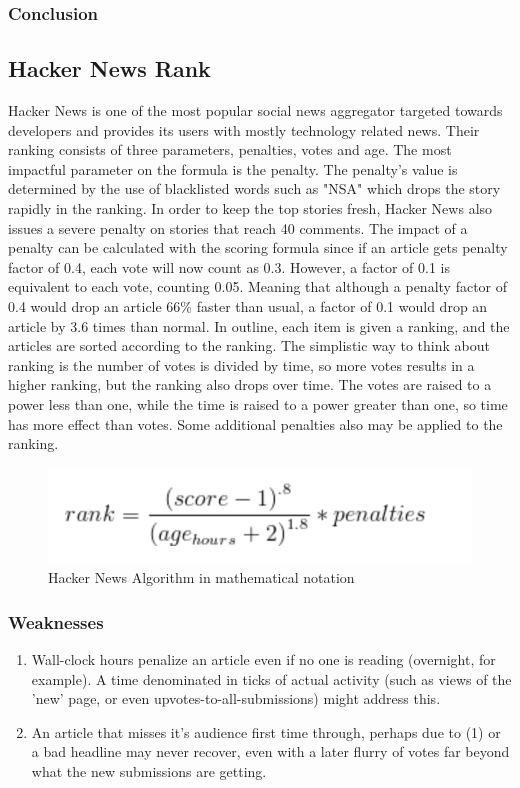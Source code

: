 \subsubsection {Conclusion}

\subsection{Hacker News Rank}
Hacker News is one of the most popular social news aggregator targeted towards developers and provides its users with mostly technology related news. Their ranking consists of three parameters, penalties, votes and age. The most impactful parameter on the formula is the penalty. The penalty's value is determined by the use of blacklisted words such as "NSA" which drops the story rapidly in the ranking. In order to keep the top stories fresh, Hacker News also issues a severe penalty on stories that reach 40 comments. The impact of a penalty can be calculated with the scoring formula since if an article gets penalty factor of 0.4, each vote will now count as 0.3. However, a factor of 0.1 is equivalent to each vote, counting 0.05. Meaning that although a penalty factor of 0.4 would drop an article 66\% faster than usual, a factor of  0.1 would drop an article by 3.6 times than normal. In outline, each item is given a ranking, and the articles are sorted according to the ranking. The simplistic way to think about ranking is the number of votes is divided by time, so more votes results in a higher ranking, but the ranking also drops over time. The votes are raised to a power less than one, while the time is raised to a power greater than one, so time has more effect than votes. Some additional penalties also may be applied to the ranking.

\begin{figure} [!htb]
  \centering
	\includegraphics{Figures/hacker_news_rank}
\caption{Hacker News Algorithm in mathematical notation}
\end{figure}

\subsubsection {Weaknesses}
\begin{enumerate}
  \item Wall-clock hours penalize an article even if no one is reading (overnight, for example). A time denominated in ticks of actual activity (such as views of the 'new' page, or even upvotes-to-all-submissions) might address this.
  \item An article that misses it's audience first time through, perhaps due to (1) or a bad headline may never recover, even with a later flurry of votes far beyond what the new submissions are getting.
\end{enumerate}

